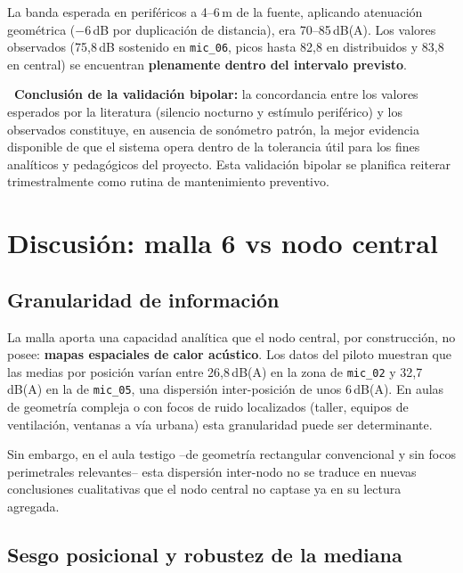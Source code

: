 \documentclass[11pt,a4paper,openany]{report}
\begin{document}
La banda esperada en perif\'ericos a 4--6\,m de la fuente, aplicando atenuaci\'on geom\'etrica ($-6$\,dB por duplicaci\'on de distancia), era 70--85\,dB(A). Los valores observados (75,8\,dB sostenido en \texttt{mic\_06}, picos hasta 82,8 en distribuidos y 83,8 en central) se encuentran \textbf{plenamente dentro del intervalo previsto}.

\begin{KeyFinding}
\textbf{\faCheckCircle\ Conclusi\'on de la validaci\'on bipolar:} la concordancia entre los valores esperados por la literatura (silencio nocturno y est\'imulo perif\'erico) y los observados constituye, en ausencia de son\'ometro patr\'on, la mejor evidencia disponible de que el sistema opera dentro de la tolerancia \'util para los fines anal\'iticos y pedag\'ogicos del proyecto. Esta validaci\'on bipolar se planifica reiterar trimestralmente como rutina de mantenimiento preventivo.
\end{KeyFinding}

\chapter{Discusi\'on: malla 6 vs nodo central}
\label{cap:discusion}

\section{Granularidad de informaci\'on}
\label{sec:discusion-arq}

La malla aporta una capacidad analítica que el nodo central, por construcci\'on, no posee: \textbf{mapas espaciales de calor ac\'ustico}. Los datos del piloto muestran que las medias por posici\'on var\'ian entre 26,8\,dB(A) en la zona de \texttt{mic\_02} y 32,7\,dB(A) en la de \texttt{mic\_05}, una dispersi\'on inter-posici\'on de unos 6\,dB(A). En aulas de geometr\'ia compleja o con focos de ruido localizados (taller, equipos de ventilaci\'on, ventanas a v\'ia urbana) esta granularidad puede ser determinante.

Sin embargo, en el aula testigo --de geometr\'ia rectangular convencional y sin focos perimetrales relevantes-- esta dispersi\'on inter-nodo no se traduce en nuevas conclusiones cualitativas que el nodo central no captase ya en su lectura agregada.

\section{Sesgo posicional y robustez de la mediana}
\end{document}

